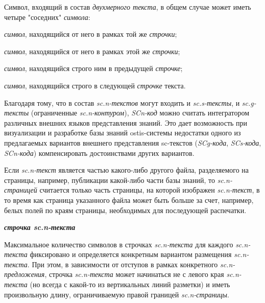 Символ, входящий в состав \textit{двухмерного текста}, в общем случае может иметь четыре "соседних"{} \textit{символа}: 
\begin{textitemize}
	\item \textit{символ}, находящийся от него  в рамках той же \textit{строчки};
	\item \textit{символ}, находящийся от него  в рамках этой же \textit{строчки};
	\item \textit{символ}, находящийся строго  ним в предыдущей \textit{строчке};
	\item \textit{символ}, находящийся строго  в следующей \textit{строчке} текста.
\end{textitemize}

Благодаря тому, что в состав \textit{sc.n-текстов} могут входить и \textit{sc.s-тексты}, и \textit{sc.g-тексты} (ограниченные \textit{sc.n-контуром}), \textit{SCn-код} можно считать интегратором различных внешних языков представления знаний.  Это дает возможность при визуализации и разработке базы знаний ostis-системы недостатки одного из предлагаемых вариантов внешнего представления sc-текстов (\textit{SCg-кода}, \textit{SCs-кода}, \textit{SCn-кода}) компенсировать достоинствами других вариантов.

\begin{SCn}
\end{SCn}

Если \textit{sc.n-текст} является частью какого-либо другого файла, разделяемого на страницы, например, публикации какой-либо части базы знаний, то \textit{sc.n-страницей} считается только часть страницы, на которой изображен \textit{sc.n-текст}, в то время как страница указанного файла может быть больше за счет, например, белых полей по краям страницы, необходимых для последующей распечатки.

\textbf{\textit{строчка sc.n-текста}}

Максимальное количество символов в строчках \textit{sc.n-текста} для каждого \textit{sc.n-текста} фиксировано и определяется конкретным вариантом размещения \textit{sc.n-текста}. При этом, в зависимости от отступов в рамках конкретного \textit{sc.n-предложения}, строчка \textit{sc.n-текста} может начинаться не с левого края \textit{sc.n-текста} (но всегда с какой-то из вертикальных линий разметки) и иметь произвольную длину, ограничиваемую правой границей \textit{sc.n-страницы}.


